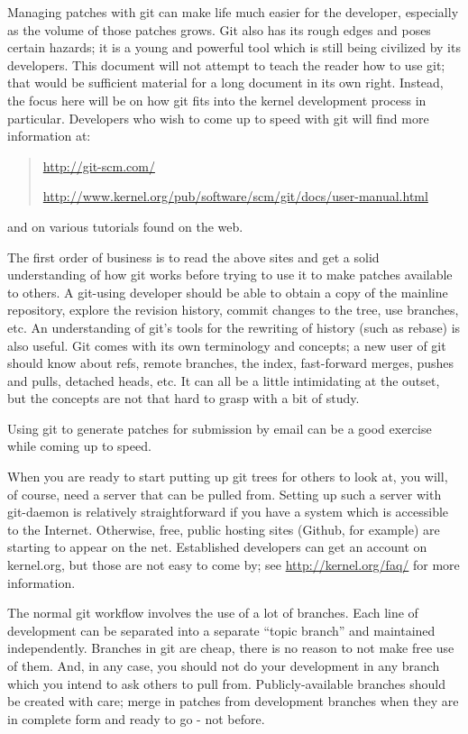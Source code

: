 \documentclass[a4paper,8pt,english]{sphinxmanual}
\begin{document}
Managing patches with git can make life much easier for the developer,
especially as the volume of those patches grows.  Git also has its rough
edges and poses certain hazards; it is a young and powerful tool which is
still being civilized by its developers.  This document will not attempt to
teach the reader how to use git; that would be sufficient material for a
long document in its own right.  Instead, the focus here will be on how git
fits into the kernel development process in particular.  Developers who
wish to come up to speed with git will find more information at:
\begin{quote}

\href{http://git-scm.com/}{http://git-scm.com/}

\href{http://www.kernel.org/pub/software/scm/git/docs/user-manual.html}{http://www.kernel.org/pub/software/scm/git/docs/user-manual.html}
\end{quote}

and on various tutorials found on the web.

The first order of business is to read the above sites and get a solid
understanding of how git works before trying to use it to make patches
available to others.  A git-using developer should be able to obtain a copy
of the mainline repository, explore the revision history, commit changes to
the tree, use branches, etc.  An understanding of git's tools for the
rewriting of history (such as rebase) is also useful.  Git comes with its
own terminology and concepts; a new user of git should know about refs,
remote branches, the index, fast-forward merges, pushes and pulls, detached
heads, etc.  It can all be a little intimidating at the outset, but the
concepts are not that hard to grasp with a bit of study.

Using git to generate patches for submission by email can be a good
exercise while coming up to speed.

When you are ready to start putting up git trees for others to look at, you
will, of course, need a server that can be pulled from.  Setting up such a
server with git-daemon is relatively straightforward if you have a system
which is accessible to the Internet.  Otherwise, free, public hosting sites
(Github, for example) are starting to appear on the net.  Established
developers can get an account on kernel.org, but those are not easy to come
by; see \href{http://kernel.org/faq/}{http://kernel.org/faq/} for more information.

The normal git workflow involves the use of a lot of branches.  Each line
of development can be separated into a separate ``topic branch'' and
maintained independently.  Branches in git are cheap, there is no reason to
not make free use of them.  And, in any case, you should not do your
development in any branch which you intend to ask others to pull from.
Publicly-available branches should be created with care; merge in patches
from development branches when they are in complete form and ready to go -
not before.
\end{document}
